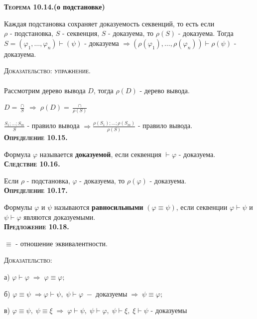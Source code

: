 \documentclass[18pt, a4paper]{extarticle}
\newcommand{\vp}{\varphi}
\newcommand{\vd}{\vdash}
\begin{document}
\textbf{\textsc{Теорема 10.14.}(о подстановке)} 

Каждая подстановка сохраняет доказуемость секвенций, то есть если \\$\rho$ -  подстановка, $S$ -  секвенция, $S$ -  доказуема, то $\rho(S)$ -  доказуема. Тогда\\
$S=(\varphi_1,\dots,\varphi_n)\vdash(\psi)$ -  доказуема $\Rightarrow (\rho(\varphi_1),\dots,\rho(\varphi_n))\vdash\rho(\psi)$ -  доказуема.

\textsc{Доказательство: упражнение.} \\\\

Рассмотрим дерево вывода $D$, тогда $\rho(D)$ -  дерево вывода.

$D=\displaystyle \frac{\cap}{S}\;\Rightarrow\;\rho(D)=\displaystyle \frac{\cap}{\rho(S)}$

$\displaystyle \frac{S_1;\dots;S_m}{S}$ -  правило вывода $\Rightarrow \displaystyle \frac{\rho(S_1);\dots;\rho(S_m)}{\rho(S)}$ -  правило вывода.\\

\textbf{\textsc{Определение 10.15.}} 

Формула $\varphi$ называется \textbf{доказуемой}, если секвенция $\vdash\varphi$ -  доказуема.\\

\textbf{\textsc{Следствие 10.16.}} 

Если $\rho$ -  подстановка, $\varphi$ -  доказуема, то $\rho(\varphi)$ -  доказуема.\\

\textbf{\textsc{Определение 10.17.}} 

Формулы $\varphi$ и $\psi$ называются \textbf{равносильными} $(\varphi\equiv\psi)$, если секвенции $\varphi\vdash\psi$ и $\psi\vdash\varphi$ являются доказуемыми.\\

\textbf{\textsc{Предложение 10.18.}} 

$\equiv$ -  отношение эквивалентности.

\textsc{Доказательство:}

а) $\varphi\vdash\varphi\;\Rightarrow\;\varphi\equiv\varphi;$

б) $\varphi\equiv\psi\;\Rightarrow\vp\vd\psi,\;\psi\vd\vp\;-\;\text{доказуемы}\;\Rightarrow\;\psi\equiv\varphi;$

в) $\varphi\equiv\psi,\;\psi\equiv\xi\;\Rightarrow\;\varphi\vdash\psi,\;\psi\vdash\varphi,\;\psi\vdash\xi,\;\xi\vdash\psi$ -  доказуемы\\
\end{document}
